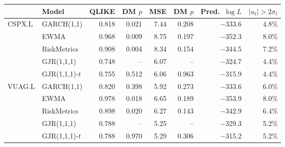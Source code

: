 \begin{tabular}{llrrrrrr}
\toprule
 & Model & QLIKE & DM $p$ & MSE & DM $p$ & Pred.\ $\log L$ & $|u_t|>2\sigma_t$ \\
\midrule
CSPX.L & GARCH(1,1) & 0.818 & 0.021 & 7.44 & 0.208 & $-$333.6 & 4.8\% \\
 & EWMA & 0.968 & 0.009 & 8.75 & 0.197 & $-$352.3 & 8.0\% \\
 & RiskMetrics & 0.908 & 0.004 & 8.34 & 0.154 & $-$344.5 & 7.2\% \\
 & GJR(1,1,1) & 0.748 & -- & 6.07 & -- & $-$324.7 & 4.4\% \\
 & GJR(1,1,1)-$t$ & 0.755 & 0.512 & 6.06 & 0.963 & $-$315.9 & 4.4\% \\
\midrule
VUAG.L & GARCH(1,1) & 0.820 & 0.398 & 5.92 & 0.273 & $-$333.6 & 6.0\% \\
 & EWMA & 0.978 & 0.018 & 6.65 & 0.189 & $-$353.9 & 8.0\% \\
 & RiskMetrics & 0.898 & 0.020 & 6.27 & 0.143 & $-$342.9 & 6.4\% \\
 & GJR(1,1,1) & 0.788 & -- & 5.25 & -- & $-$329.3 & 5.2\% \\
 & GJR(1,1,1)-$t$ & 0.788 & 0.970 & 5.29 & 0.306 & $-$315.2 & 5.2\% \\
\bottomrule
\end{tabular}